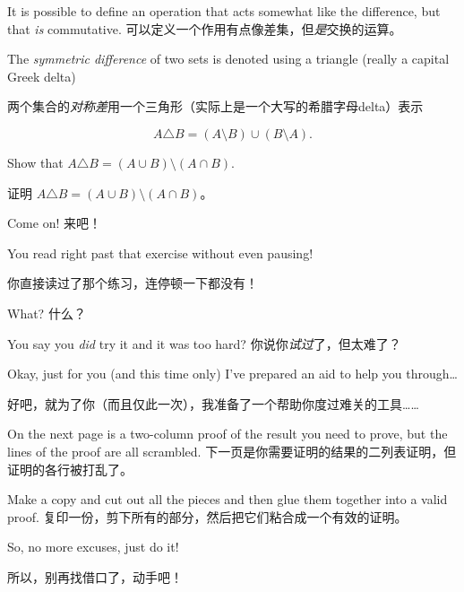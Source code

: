 It is possible to define an operation that acts somewhat 
like the difference, but that \emph{is} commutative.
可以定义一个作用有点像差集，但\emph{是}交换的运算。

The 
\emph{symmetric difference} 
of two sets is denoted using a 
triangle (really a capital Greek delta)

两个集合的\emph{对称差}用一个三角形（实际上是一个大写的希腊字母delta）表示

\[ A \triangle B = (A \setminus B) \cup (B\setminus A).
\]

\begin{exer}
Show that  $A \triangle B = (A \cup B) \setminus (A \cap B)$.

证明 $A \triangle B = (A \cup B) \setminus (A \cap B)$。
\end{exer}

Come on!
来吧！

You read right past that exercise without even pausing!

你直接读过了那个练习，连停顿一下都没有！

What?
什么？

You say you \emph{did} try it and it was too hard?
你说你\emph{试过}了，但太难了？

Okay, just for you (and this time only) I've prepared an aid to
help you through\ldots

好吧，就为了你（而且仅此一次），我准备了一个帮助你度过难关的工具……

On the next page is a two-column proof of the result you need to 
prove, but the lines of the proof are all scrambled.
下一页是你需要证明的结果的二列表证明，但证明的各行被打乱了。

Make a copy and cut out all the pieces and then glue them together
into a valid proof.
复印一份，剪下所有的部分，然后把它们粘合成一个有效的证明。

So, no more excuses, just do it!

所以，别再找借口了，动手吧！

\newpage




